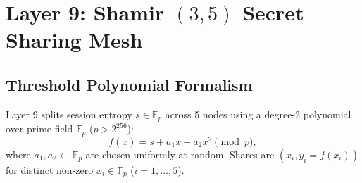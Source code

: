 \documentclass{ieeeaccess}
\newcommand{\F}{\mathbb{F}}
\begin{document}
\section{Layer 9: Shamir $(3,5)$ Secret Sharing Mesh}
\label{sec:L9}

\subsection{Threshold Polynomial Formalism}
Layer 9 splits session entropy $s \in \F_p$ across 5 nodes using a degree-2 polynomial over prime field $\F_p$ ($p > 2^{256}$):
\begin{equation}
  f(x) = s + a_1 x + a_2 x^2 \pmod p,
\end{equation}
where $a_1, a_2 \leftarrow \F_p$ are chosen uniformly at random. Shares are $(x_i, y_i = f(x_i))$ for distinct non-zero $x_i \in \F_p$ ($i=1,\dots,5$).
\end{document}
